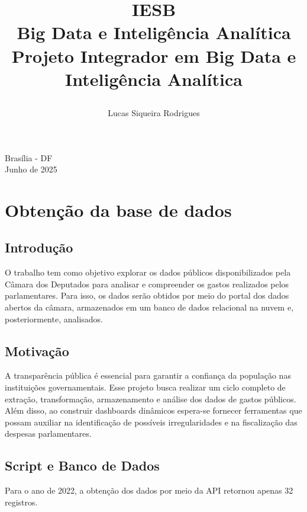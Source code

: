 \documentclass[12pt, a4paper]{article}
\title{
    \textbf{IESB} \\
    \large Big Data e Inteligência Analítica \\
    \vspace{10cm}
    \textbf{Projeto Integrador em Big Data e Inteligência Analítica}
    \author{Lucas Siqueira Rodrigues}
}
\begin{document}
\begin{titlepage}
    \maketitle
    \begin{center}
        \vspace{\fill}
        Brasília - DF \\
        Junho de 2025
    \end{center}
\end{titlepage}


\section{Obtenção da base de dados}
\subsection{Introdução}
O trabalho tem como objetivo explorar os dados públicos disponibilizados pela Câmara dos Deputados para analisar e compreender os gastos realizados pelos parlamentares. Para isso, os dados serão obtidos por meio do portal dos dados abertos da câmara\cite{dados_abertos}, armazenados em um banco de dados relacional na nuvem e, posteriormente, analisados.

\subsection{Motivação}
A transparência pública é essencial para garantir a confiança da população nas instituições governamentais. Esse projeto busca realizar um ciclo completo de extração, transformação, armazenamento e análise dos dados de gastos públicos. Além disso, ao construir dashboards dinâmicos espera-se fornecer ferramentas que possam auxiliar na identificação de possíveis irregularidades e na fiscalização das despesas parlamentares.


\subsection{Script e Banco de Dados}
Para o ano de 2022, a obtenção dos dados por meio da API\cite{dados_abertos} retornou apenas 32 registros.
\end{document}
